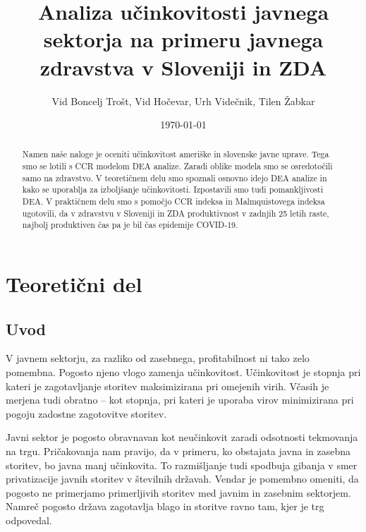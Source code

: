 \documentclass[12pt,a4paper]{article}
\theoremstyle{definition}
\begin{document}
\setlength{\parskip}{1em}
\setlength{\parindent}{0pt}

\title{Analiza učinkovitosti javnega sektorja na primeru javnega zdravstva v Sloveniji in ZDA}
\author{Vid Boncelj Trošt, Vid Hočevar, Urh Videčnik, Tilen Žabkar}
\date{\today}
\maketitle

\begin{abstract}
    Namen naše naloge je oceniti učinkovitost ameriške in slovenske javne
    uprave. Tega smo se lotili s CCR modelom DEA analize. Zaradi oblike modela
    smo se osredotočili samo na zdravstvo. V teoretičnem
    delu smo spoznali osnovno idejo DEA analize in kako se uporablja za 
    izboljšanje učinkovitosti. Izpostavili smo tudi pomankljivosti DEA. 
    V praktičnem delu smo s pomočjo CCR indeksa in Malmquistovega indeksa
    ugotovili, da v zdravstvu v Sloveniji in ZDA produktivnost v zadnjih
    25 letih raste, najbolj produktiven čas pa je bil čas epidemije COVID-19. 
\end{abstract}

\newpage

\begingroup
\setlength{\parskip}{5pt}
\tableofcontents
\endgroup

\newpage

\section{Teoretični del}

\subsection{Uvod}

V javnem sektorju, za razliko od zasebnega, profitabilnost
ni tako zelo pomembna. Pogosto njeno vlogo zamenja učinkovitost. 
Učinkovitost je stopnja pri kateri je zagotavljanje storitev maksimizirana pri omejenih 
virih. Včasih je merjena tudi obratno -- kot stopnja, pri kateri je uporaba virov 
minimizirana pri pogoju zadostne zagotovitve storitev. 

Javni sektor je pogosto obravnavan kot neučinkovit zaradi odsotnosti
tekmovanja na trgu. Pričakovanja nam pravijo, da v primeru, ko obstajata
javna in zasebna storitev, bo javna manj učinkovita. To razmišljanje tudi
spodbuja gibanja v smer privatizacije javnih storitev v številnih državah.
Vendar je pomembno omeniti, da pogosto ne primerjamo primerljivih
storitev med javnim in zasebnim sektorjem. Namreč 
pogosto država zagotavlja blago in storitve ravno tam, kjer je trg odpovedal.
\cite{Lovell2002}
\end{document}
